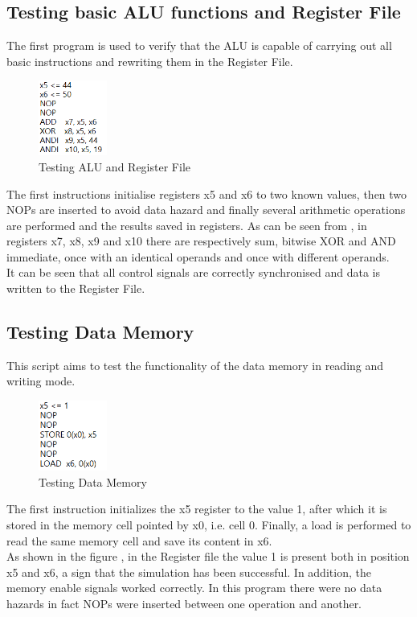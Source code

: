 \subsection{Testing basic ALU functions and Register File}
The first program is used to verify that the ALU is capable of carrying out all basic instructions and rewriting them in the Register File.
\begin{figure}[H]
	\centering
	\includegraphics[width=0.2\textwidth]{sec3/images/test1.png}
	\caption{Testing ALU and Register File}
	\label{fig:test1}
\end{figure}
\noindent The first instructions initialise registers x5 and x6 to two known values, then two NOPs are inserted to avoid data hazard and finally several arithmetic operations are performed and the results saved in registers. As can be seen from , in registers x7, x8, x9 and x10 there are respectively sum, bitwise XOR and AND immediate, once with an identical operands and once with  different operands.\\
It can be seen that all control signals are correctly synchronised and data is written to the Register File.

\subsection{Testing Data Memory}
This script aims to test the functionality of the data memory in reading and writing mode.
\begin{figure}[H]
	\centering
	\includegraphics[width=0.2\textwidth]{sec3/images/test2.png}
	\caption{Testing Data Memory}
	\label{fig:test2}
\end{figure}
\noindent The first instruction initializes the x5 register to the value 1, after which it is stored in the memory cell pointed by x0, i.e. cell 0. Finally, a load is performed to read the same memory cell and save its content in x6.\\
As shown in the figure , in the Register file the value 1 is present both in position x5 and x6, a sign that the simulation has been successful. In addition, the memory enable signals worked correctly. In this program there were no data hazards in fact NOPs were inserted between one operation and another.

